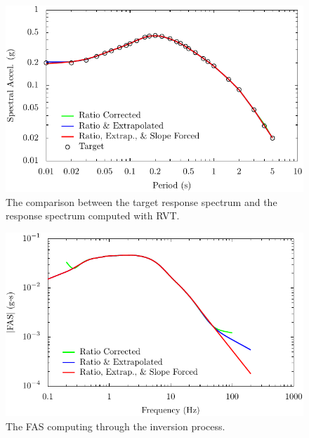 \documentclass[12pt,oneside]{book}
\begin{document}
\begin{figure}[p]
    \begin{center}
        \includegraphics[width=0.95\linewidth]{figures/siteResponse/irvt-respSpec.pdf}
    \end{center}
    \caption{The comparison between the target response spectrum and the response spectrum computed with
    RVT.}
    \label{fig:irvt:sa}
\end{figure}
\begin{figure}[p]
    \begin{center}
        \includegraphics[width=0.95\linewidth]{figures/siteResponse/irvt-fas.pdf}
    \end{center}
    \caption{The FAS computing through the inversion process.}
    \label{fig:irvt:fas}
\end{figure}
\end{document}
